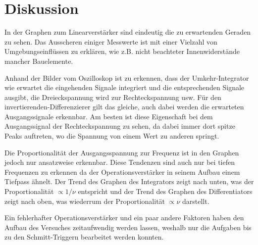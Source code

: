 \newpage
\section{Diskussion}
\label{sec:diskussion}
    In der Graphen zum Linearverstärker sind eindeutig die zu erwartenden Geraden zu sehen. Das Ausscheren einiger Messwerte ist mit einer Vielzahl von Umgebungseinflüssen zu erklären, wie z.B. nicht beachteter Innenwiderstände mancher Bauelemente.

    Anhand der Bilder vom Oszilloskop ist zu erkennen, dass der Umkehr-Integrator wie erwartet die eingehenden Signale integriert und die entsprechenden Signale ausgibt, die Dreieckspannung wird zur Rechteckspannung usw.
    Für den invertierenden-Differenzierer gilt das gleiche, auch dabei werden die erwarteten Ausgangssignale erkennbar.
    Am besten ist diese Eigenschaft bei dem Ausgangssignal der Rechteckspannung zu sehen, da dabei immer dort spitze Peaks auftreten, wo die Spannung von einem Wert zu anderen springt.

    Die Proportionalität der Ausgangsspannung zur Frequenz ist in den Graphen jedoch nur ansatzweise erkennbar.
    Diese Tendenzen sind auch nur bei tiefen Frequenzen zu erkennen da der Operationsverstärker in seinem Aufbau einem Tiefpass ähnelt.
    Der Trend des Graphen des Integrators zeigt nach unten, was der Proportionalität $\propto 1 / \nu$ entspricht und der Trend des Graphen des Differentiators zeigt nach oben, was wiederrum der Proportionalität $\propto \nu$ darstellt.

    Ein fehlerhafter Operationsverstärker und ein paar andere Faktoren haben den Aufbau des Versuches zeitaufwendig werden lassen, weshalb nur die Aufgaben bis zu den Schmitt-Triggern bearbeitet werden konnten.
